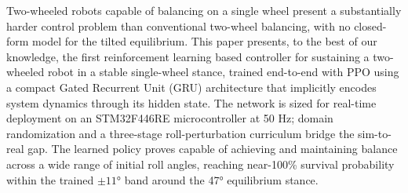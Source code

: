 Two-wheeled robots capable of balancing on a single wheel present a substantially harder control problem than conventional two-wheel balancing, with no closed-form model for the tilted equilibrium. This paper presents, to the best of our knowledge, the first reinforcement learning based controller for sustaining a two-wheeled robot in a stable single-wheel stance, trained end-to-end with PPO using a compact Gated Recurrent Unit (GRU) architecture that implicitly encodes system dynamics through its hidden state. The network is sized for real-time deployment on an STM32F446RE microcontroller at 50 Hz; domain randomization and a three-stage roll-perturbation curriculum bridge the sim-to-real gap. The learned policy proves capable of achieving and maintaining balance across a wide range of initial roll angles, reaching near-100\% survival probability within the trained $\pm 11°$ band around the 47° equilibrium stance.

